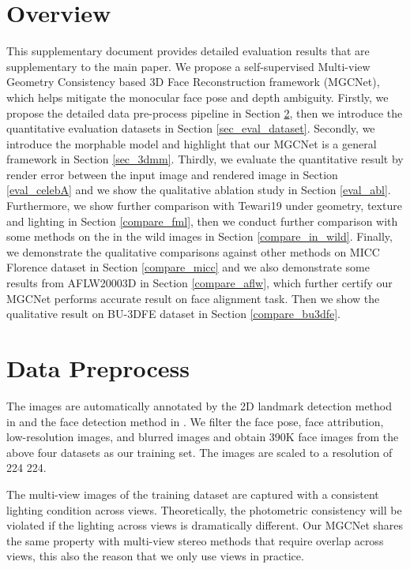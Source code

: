 \documentclass[runningheads]{llncs}
\begin{document}
\section{Overview}
This supplementary document provides detailed evaluation results that are supplementary to the main paper.
We propose a self-supervised Multi-view Geometry Consistency based 3D Face Reconstruction framework (MGCNet), which helps mitigate the monocular face pose and depth ambiguity.
Firstly, we propose the detailed data pre-process pipeline in Section \ref{sec_data_pre}, then we introduce the quantitative evaluation datasets in Section \ref{sec_eval_dataset}.
Secondly, we introduce the morphable model and highlight that our MGCNet is a general framework in Section \ref{sec_3dmm}.
Thirdly, we evaluate the quantitative result by render error between the input image and rendered image in Section \ref{eval_celebA} and we show the qualitative ablation study in Section \ref{eval_abl}.
Furthermore, we show further comparison with Tewari19 \cite{unsuper_mul_tewari2019fml} under geometry, texture and lighting in Section \ref{compare_fml}, then we conduct further comparison with some methods on the in the wild images in Section \ref{compare_in_wild}. Finally, we demonstrate the qualitative comparisons against other methods on MICC Florence dataset \cite{dataset_florence} in Section \ref{compare_micc} and we also demonstrate some results from AFLW20003D \cite{dataset_aflw20003D_300WLP_zhu2016face} in Section \ref{compare_aflw}, which further certify our MGCNet performs accurate result on face alignment task. Then we show the qualitative result on BU-3DFE dataset \cite{dataset_bu3dfe_yin20063d,dataset_bu4dfe_yin20063d} in Section \ref{compare_bu3dfe}.\section{Data Preprocess}  \label{sec_data_pre}
The images are automatically annotated by the 2D landmark detection method in \cite{dataset_bulat2017far_lsw3d} and the face detection method in \cite{zhang2017s3fd}.
We filter the face pose, face attribution, low-resolution images, and blurred images and obtain 390K face images from the above four datasets as our training set.
The images are scaled to a resolution of 224  224. 

The multi-view images of the training dataset are captured with a consistent lighting condition across views. Theoretically, the photometric consistency will be violated if the lighting across views is dramatically different. Our MGCNet shares the same property with multi-view stereo methods that require overlap across views, this also the reason that we only use  views in practice.
\end{document}
